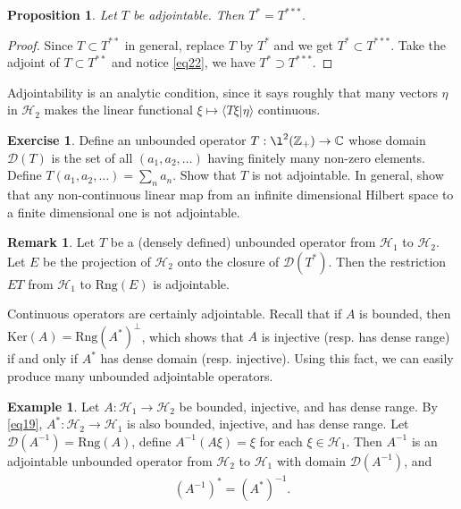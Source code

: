 \documentclass[12pt,b5paper,notitlepage]{article}
\theoremstyle{definition}
\newtheorem{eg}[df]{Example}
\newtheorem{exe}[df]{Exercise}
\newtheorem{rem}[df]{Remark}
\theoremstyle{plain}
\newtheorem{pp}[df]{Proposition}
\newcommand{\mc}{\mathcal}
\newcommand{\Dom}{\scr D}
\newcommand{\bk}[1]{\langle {#1}\rangle}
\newcommand{\scr}{\mathscr}
\newcommand{\Cbb}{\mathbb C}
\newcommand{\Zbb}{\mathbb Z}
\newcommand{\Rng}{\mathrm{Rng}}
\numberwithin{equation}{section}
\begin{document}
\begin{pp}\label{lb10}
Let $T$ be adjointable. Then $T^*=T^{***}$.
\end{pp}

\begin{proof}
Since $T\subset T^{**}$ in general, replace $T$ by $T^*$ and we get $T^*\subset T^{***}$. Take the adjoint of $T\subset T^{**}$ and notice \eqref{eq22}, we have $T^*\supset T^{***}$.
\end{proof}


Adjointability is an analytic condition, since it says roughly that many vectors  $\eta$ in $\mc H_2$ makes the linear functional $\xi\mapsto\bk{T\xi|\eta}$ continuous. 

\begin{exe}
Define an unbounded operator $T:\l^2(\Zbb_+)\rightarrow\Cbb$ whose domain $\Dom(T)$ is the set of all $(a_1,a_2,\dots)$ having finitely many non-zero elements. Define $T(a_1,a_2,\dots)=\sum_n a_n$. Show that $T$ is not adjointable. In general, show that any non-continuous linear map from an infinite dimensional Hilbert space to a finite dimensional one is not adjointable. 
\end{exe}


\begin{rem}
Let $T$ be a (densely defined) unbounded operator from $\mc H_1$ to $\mc H_2$. Let $E$ be the projection of $\mc H_2$ onto the closure of $\Dom(T^*)$. Then the restriction $ET$ from $\mc H_1$ to $\Rng(E)$ is adjointable.
\end{rem}


Continuous operators are certainly adjointable. Recall that if $A$ is bounded, then $\mathrm{Ker}(A)=\Rng(A^*)^\perp$, which shows that $A$ is injective (resp. has dense range) if and only if $A^*$ has dense domain (resp. injective). Using this fact, we can easily produce many unbounded adjointable operators.

\begin{eg}\label{lb13}
Let $A:\mc H_1\rightarrow\mc H_2$ be bounded, injective, and has dense range. By \eqref{eq19}, $A^*:\mc H_2\rightarrow\mc H_1$ is also bounded, injective, and has dense range. Let $\Dom(A^{-1})=\Rng(A)$, define $A^{-1}(A\xi)=\xi$ for each $\xi\in\mc H_1$. Then $A^{-1}$ is an adjointable unbounded operator from $\mc H_2$ to $\mc H_1$ with domain $\Dom(A^{-1})$, and
\begin{align}
(A^{-1})^*=(A^*)^{-1}.	\label{eq8}
\end{align}
\end{eg}
\end{document}
